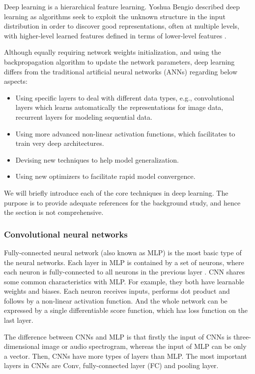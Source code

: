 Deep learning is a hierarchical feature learning. Yoshua Bengio described deep learning as algorithms seek to exploit the unknown structure in the input distribution in order to discover good representations, often at multiple levels, with higher-level learned features defined in terms of lower-level features \cite{Bengio2012a}.

Although equally requiring network weights initialization, and using the backpropagation algorithm to update the network parameters, deep learning differs from the traditional artificial neural networks (ANNs) regarding below aspects:

\begin{itemize}[noitemsep]

\item Using specific layers to deal with different data types, e.g., convolutional layers which learns automatically the representations for image data, recurrent layers for modeling sequential data.
\item Using more advanced non-linear activation functions, which facilitates to train very deep architectures.
\item Devising new techniques to help model generalization.
\item Using new optimizers to facilitate rapid model convergence.
\end{itemize} 

We will briefly introduce each of the core techniques in deep learning. The purpose is to provide adequate references for the background study, and hence the section is not comprehensive.

\subsubsection{Convolutional neural networks}

Fully-connected neural network (also known as \gls{MLP}) is the most basic type of the neural networks. Each layer in \gls{MLP} is contained by a set of neurons, where each neuron is fully-connected to all neurons in the previous layer \cite{Stanforduniversity}. \gls{CNN} shares some common characteristics with \gls{MLP}. For example, they both have learnable weights and biases. Each neuron receives inputs, performs dot product and follows by a non-linear activation function. And the whole network can be expressed by a single differentiable score function, which has loss function on the last layer.

The difference between \gls{CNN}s and \gls{MLP} is that firstly the input of \gls{CNN}s is three-dimensional image or audio spectrogram, whereas the input of \gls{MLP} can be only a vector. Then, \gls{CNN}s have more types of layers than \gls{MLP}. The most important layers in \gls{CNN}s are \gls{Conv}, fully-connected layer (FC) and pooling layer.

